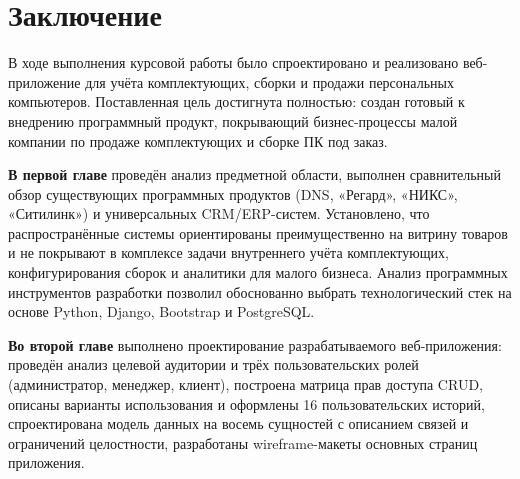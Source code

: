 \documentclass[14pt, a4paper]{extarticle}
\begin{document}
\section*{Заключение}

В ходе выполнения курсовой работы было спроектировано и реализовано веб-приложение для учёта комплектующих, сборки и продажи персональных компьютеров. Поставленная цель достигнута полностью: создан готовый к внедрению программный продукт, покрывающий бизнес-процессы малой компании по продаже комплектующих и сборке ПК под заказ.

\textbf{В первой главе} проведён анализ предметной области, выполнен сравнительный обзор существующих программных продуктов (DNS, «Регард», «НИКС», «Ситилинк») и универсальных CRM/ERP-систем. Установлено, что распространённые системы ориентированы преимущественно на витрину товаров и не покрывают в комплексе задачи внутреннего учёта комплектующих, конфигурирования сборок и аналитики для малого бизнеса. Анализ программных инструментов разработки позволил обоснованно выбрать технологический стек на основе Python, Django, Bootstrap и PostgreSQL.

\textbf{Во второй главе} выполнено проектирование разрабатываемого веб-приложения: проведён анализ целевой аудитории и трёх пользовательских ролей (администратор, менеджер, клиент), построена матрица прав доступа CRUD, описаны варианты использования и оформлены 16 пользовательских историй, спроектирована модель данных на восемь сущностей с описанием связей и ограничений целостности, разработаны wireframe-макеты основных страниц приложения.
\end{document}
